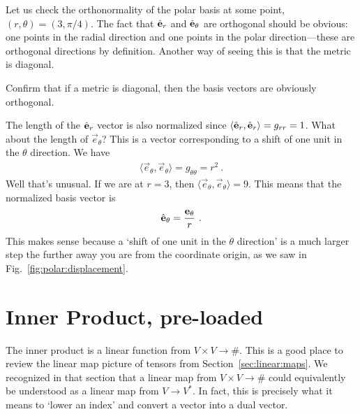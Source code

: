 \documentclass[12pt, oneside]{report}    %
\let\oldsection\section
\def\section{%
  \setcounter{sidenote}{1}%
  \oldsection
}
\begin{document}
Let us check the orthonormality of the polar basis at some point, $(r,\theta) = (3,\pi/4)$. The fact that $\hat{\mathbf{e}}_r$ and $\hat{\mathbf{e}}_\theta$ are orthogonal should be obvious: one points in the radial direction and one points in the polar direction---these are orthogonal directions by definition. Another way of seeing this is that the metric is diagonal. 
\begin{exercise}
Confirm that if a metric is diagonal, then the basis vectors are obviously orthogonal. 
\end{exercise}
The length of the $\hat{\mathbf{e}}_r$ vector is also normalized since $\langle \hat{\mathbf{e}}_r, \hat{\mathbf{e}}_r\rangle = g_{rr} = 1$. What about the length of $\vec{e}_\theta$? This is a vector corresponding to a shift of one unit in the $\theta$ direction. We have
\begin{align}
    \langle \vec{e}_\theta, \vec{e}_\theta \rangle = g_{\theta\theta} = r^2 \ .
\end{align}
Well that's unusual. If we are at $r=3$, then $\langle \vec{e}_\theta, \vec{e}_\theta \rangle = 9$. This means that the normalized basis vector is
\begin{align}
    \hat{\mathbf{e}}_\theta = \frac{\mathbf{e}_\theta}{r} \ .
\end{align}
This makes sense because a `shift of one unit in the $\theta$ direction' is a much larger step the further away you are from the coordinate origin, as we saw in Fig.~\ref{fig:polar:displacement}.










\section{Inner Product, pre-loaded}\label{eq:inner:product:pre:loaded}

The inner product is a linear function from $V\times V \to \#$. This is a good place to review the linear map picture of tensors from Section~\ref{sec:linear:maps}. We recognized in that section that a linear map from $V\times V \to \#$ could equivalently be understood as a linear map from $V \to V^*$. In fact, this is precisely what it means to `lower an index' and convert a vector into a dual vector.
\end{document}
